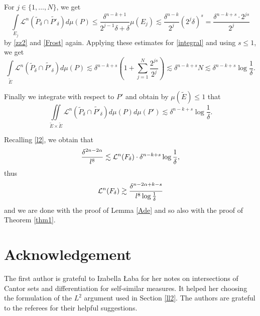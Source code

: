 \documentclass[a4paper]{amsart}
\theoremstyle{definition} \newtheorem{remark}[theorem]{Remark}
\def\al{\alpha}
\def\de{\delta}
\def\ti{\widetilde}
\def\leb{\mathcal{L}}
\def\lkb{\lesssim}
\def\gkb{\gtrsim}
\begin{document}
For $j \in \{1,\dots,N\}$, we get 
\begin{equation}
\label{zz4}
\int\limits_{E_j} \leb^n (\ti{P}_{\de} \cap \ti{P'}_{\de}) d\mu(P) \leq \frac{\de^{n-k+1}}{2^{j-1}\de +\de} \mu(E_j) \lkb \frac{\de^{n-k}}{2^j} (2^j\de)^s
= \frac{\de^{n-k+s} \cdot 2^{js}}{2^j} 
\end{equation}
by \eqref{zz2} and \eqref{Frost} again. 
Applying these estimates for \eqref{integral} and using $s \leq 1$, we get
$$\int\limits_{\ti{E}} \leb^n (\ti{P}_{\de} \cap \ti{P'}_{\de}) d\mu(P) \lkb \de^{n-k+s} \left(1+ \sum_{j=1}^{ N } \frac{2^{js}}{2^j} \right) 
\lkb \de^{n-k+s} N \lkb \de^{n-k+s} \log \frac{1}{\de}.$$

Finally we integrate with respect to $P'$ and obtain by $\mu(\ti{E}) \leq 1$ that 
$$\iint\limits_{\ti{E} \times \ti{E}} \leb^n (\ti{P}_{\de} \cap \ti{P'}_{\de}) d\mu(P) d\mu(P') \lkb \de^{n-k+s} \log \frac{1}{\de}.$$ 

Recalling \eqref{l2}, we obtain that 
$$\frac{\de^{2n-2\al}}{\rc^8} \lkb
\leb^n(F_{\de})
\cdot 
\de^{n-k+s} \log \frac{1}{\de},$$ 
 thus
$$\leb^n(F_{\de}) \gkb 
\frac{\de^{n-2\al+k-s}}{\rc^8 \log \frac{1}{\de}}$$ 
and we are done with the proof of Lemma \ref{Ade} and so also with the proof of Theorem \ref{thm1}. 

\section*{Acknowledgement}
The first author is grateful to Izabella {\L}aba for her notes on 
intersections of Cantor sets and differentiation for self-similar measures. 
It helped her choosing the formulation of the $\mathit{L}^2$ argument used in Section \ref{ll2}. 
The authors are grateful to the referees for their helpful suggestions. 
\end{document}
